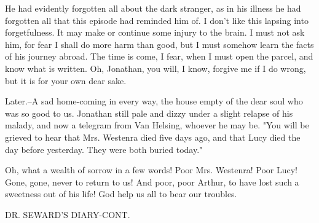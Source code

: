 He had evidently forgotten all about the dark stranger, as in his illness he had forgotten all that this episode had reminded him of. I don't like this lapsing into forgetfulness. It may make or continue some injury to the brain. I must not ask him, for fear I shall do more harm than good, but I must somehow learn the facts of his journey abroad. The time is come, I fear, when I must open the parcel, and know what is written. Oh, Jonathan, you will, I know, forgive me if I do wrong, but it is for your own dear sake. 

Later.--A sad home-coming in every way, the house empty of the dear soul who was so good to us. Jonathan still pale and dizzy under a slight relapse of his malady, and now a telegram from Van Helsing, whoever he may be. "You will be grieved to hear that Mrs. Westenra died five days ago, and that Lucy died the day before yesterday. They were both buried today." 

Oh, what a wealth of sorrow in a few words! Poor Mrs. Westenra! Poor Lucy! Gone, gone, never to return to us! And poor, poor Arthur, to have lost such a sweetness out of his life! God help us all to bear our troubles. 

DR. SEWARD'S DIARY-CONT. 

